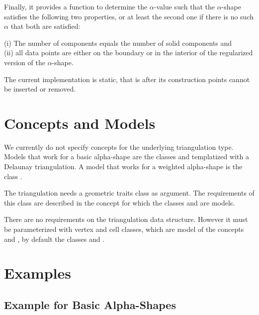 Finally, it provides a function to determine the $\alpha$-value
such that the $\alpha$-shape  satisfies the following two properties,
or at least the second one if there is no such $\alpha$ that both
are satisfied:

(i) The number of components equals the number of solid components and\\
(ii) all data points are either on the boundary or in the interior of the regularized version of 
the $\alpha$-shape.

\smallskip
The current implementation is static, that is after its construction
points cannot be inserted or removed.

\section{Concepts and Models\label{I1_SectDtClass3D}}


We currently do not specify concepts for the underlying triangulation
type. Models that work for a basic alpha-shape are the classes
 and 
 templatized with a Delaunay
triangulation. A model that works for a weighted alpha-shape is 
the class .

The triangulation needs a geometric traits class as argument.
The requirements of this class are described in the 
concept  for which
the classes 
and  are models.

There are no requirements on the triangulation data structure.
However it must be parameterized with 
vertex and cell classes, which are model of the concepts
 and ,
by default the classes  
and .





\section{Examples}
\subsection{Example for Basic Alpha-Shapes\label{I1_SectClassicAS3D}}

